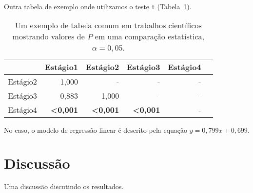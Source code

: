 Outra tabela de exemplo onde utilizamos o teste \texttt{t} (Tabela~\ref{tab:areap}).

\begin{table}[htbp]
  \caption[Tabelas com valores de $P$]{Um exemplo de tabela comum em trabalhos científicos mostrando valores de $P$ em uma comparação estatística, $\alpha=0,05$.}
  \label{tab:areap}
  \vspace{1em}
  \centering
  \begin{tabular}{l r r r r r}
    \toprule
     ~		&	Estágio1	&	Estágio2	&	Estágio3	&	Estágio4\\
     \midrule
     Estágio2	&	1,000		&	-		&	-		&	-\\
     Estágio3	&	0,883		&	1,000		&	-		&	-\\
     Estágio4	&	\textbf{<0,001}	&	\textbf{<0,001}	&	\textbf{<0,001}	&	-\\
     \bottomrule
   \end{tabular}
 \end{table}

No caso, o modelo de regressão linear é descrito pela equação $y=0,799x+0,699$.

\section{Discussão}\label{cap3:disc}

Uma discussão discutindo os resultados.

